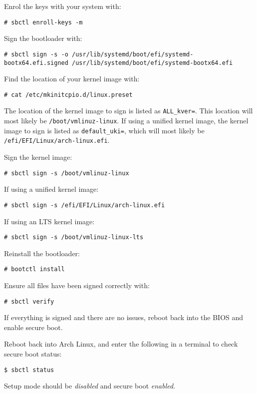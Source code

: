 \documentclass[a4paper]{article}
\begin{document}
Enrol the keys with your system with:
\begin{lstlisting}
# sbctl enroll-keys -m
\end{lstlisting}

Sign the bootloader with:
\begin{lstlisting}
# sbctl sign -s -o /usr/lib/systemd/boot/efi/systemd-bootx64.efi.signed /usr/lib/systemd/boot/efi/systemd-bootx64.efi
\end{lstlisting}

Find the location of your kernel image with:
\begin{lstlisting}
# cat /etc/mkinitcpio.d/linux.preset 
\end{lstlisting}

The location of the kernel image to sign is listed as \lstinline|ALL_kver=|.
This location will most likely be \lstinline|/boot/vmlinuz-linux|.
If using a unified kernel image, the kernel image to sign is listed as \lstinline|default_uki=|, which will most likely be \lstinline|/efi/EFI/Linux/arch-linux.efi|.

Sign the kernel image:
\begin{lstlisting}
# sbctl sign -s /boot/vmlinuz-linux
\end{lstlisting}
If using a unified kernel image:
\begin{lstlisting}
# sbctl sign -s /efi/EFI/Linux/arch-linux.efi
\end{lstlisting}
If using an LTS kernel image:
\begin{lstlisting}
# sbctl sign -s /boot/vmlinuz-linux-lts
\end{lstlisting}

Reinstall the bootloader:
\begin{lstlisting}
# bootctl install
\end{lstlisting}

Ensure all files have been signed correctly with:
\begin{lstlisting}
# sbctl verify
\end{lstlisting}

If everything is signed and there are no issues, reboot back into the BIOS and enable secure boot.

Reboot back into Arch Linux, and enter the following in a terminal to check secure boot status:
\begin{lstlisting}
$ sbctl status
\end{lstlisting}

Setup mode should be \emph{disabled} and secure boot \emph{enabled}.
\end{document}
